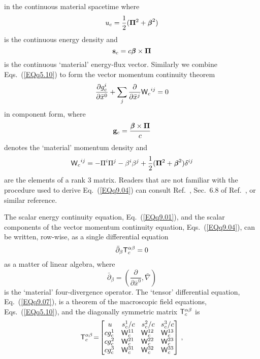 \documentclass[twocolumn,amssymb,eqsecnum,aps,pra]{revtex4-2}
\begin{document}
in the continuous material spacetime
where
\begin{equation}
u_c=\frac{1}{2} ( {\bf \Pi}^2+{{\beta}\hskip -5.6pt {\beta}}^2) 
\label{EQq9.02}
\end{equation}
is the continuous energy density and
\begin{equation}
{\bf s}_c=c{{\beta}\hskip -5.6pt {\beta}}\times{\bf \Pi}
\label{EQq9.03}
\end{equation}
is the continuous `material' energy-flux vector.
Similarly we combine Eqs.~(\ref{EQq5.10}) to form the vector momentum
continuity theorem
\begin{equation}
\frac{\partial g^i_c}{\partial \bar x^0}
+\sum_j\frac{\partial}{\partial \bar x^j}{{\sf W}_c}^{ij}=0
\label{EQq9.04}
\end{equation}
in component form, where
\begin{equation}
{\bf g}_c=\frac{{{\beta}\hskip -5.6pt {\beta}}\times{\bf \Pi}}{c}
\label{EQq9.05}
\end{equation}
denotes the `material' momentum density and
\begin{equation}
{{\sf W}_c}^{ij}=-\Pi^i\Pi^j-\beta^i\beta^j+
\frac{1}{2} ({\bf \Pi}^2+{{\beta}\hskip -5.6pt {\beta}}^2)\delta^{ij}
\label{EQq9.06}
\end{equation}
are the elements of a rank 3 matrix.
Readers that are not familiar with the procedure used to derive
Eq.~(\ref{EQq9.04}) can consult Ref.~\cite{BIBoydMil},
Sec.~6.8 of Ref.~\cite{BIJackson}, or similar reference.
\par
The scalar energy continuity equation, Eq.~(\ref{EQq9.01}),
and the scalar components of the vector momentum continuity
equation, Eqs.~(\ref{EQq9.04}), can be
written, row-wise, as a single differential equation \cite{BIOptCommun}
\begin{equation}
\bar \partial_{\beta} {\sf T}_c^{\alpha\beta} =0
\label{EQq9.07}
\end{equation}
as a matter of linear algebra, where
\begin{equation}
\bar \partial_{\beta} =\left (\frac{\partial}{\partial \bar x^0},
\bar\nabla\right ) 
\label{EQq9.08}
\end{equation}
is the `material' four-divergence operator.
The `tensor' differential equation, Eq.~(\ref{EQq9.07}), is a theorem
of the macroscopic field equations, Eqs.~(\ref{EQq5.10}),
and the diagonally symmetric matrix ${\sf T}_c^{\alpha\beta}$ is
\begin{equation}
{\sf T}_c^{\alpha\beta}
\! = \!
\left [
\begin{matrix}
{u}    \!&{s}_c^1/c        \!&{s}_c^2/c           \!&{s}_c^3/c
\cr
c{g}_c^1   &{\sf W}_c^{11}   &{\sf W}_c^{12}      &{\sf W}_c^{13}
\cr
c{g}_c^2   &{\sf W}_c^{21}   &{\sf W}_c^{22}      &{\sf W}_c^{23}
\cr
c{g}_c^3   &{\sf W}_c^{31}   &{\sf W}_c^{32}      &{\sf W}_c^{33}
\cr
\end{matrix}
\right ] \, ,
\label{EQq9.09}
\end{equation}
\end{document}
